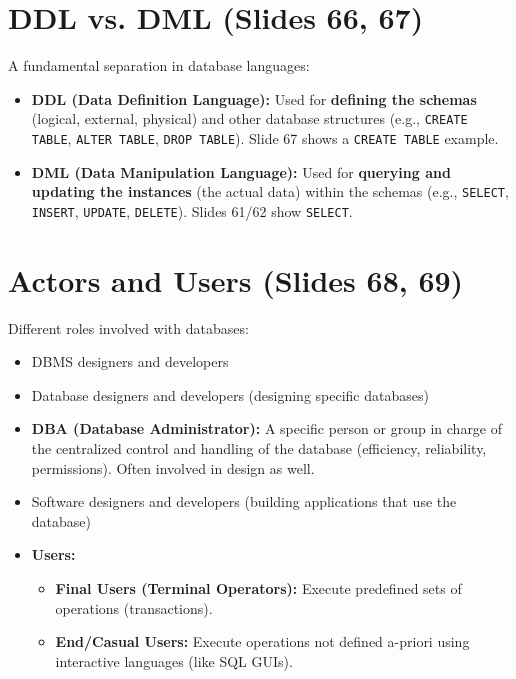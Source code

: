 \documentclass{article}
\begin{document}
	\section{DDL vs. DML (Slides 66, 67)}
	A fundamental separation in database languages:
	\begin{itemize}
		\item \textbf{DDL (Data Definition Language):} Used for \textbf{defining the schemas} (logical, external, physical) and other database structures (e.g., \texttt{CREATE TABLE}, \texttt{ALTER TABLE}, \texttt{DROP TABLE}). Slide 67 shows a \texttt{CREATE TABLE} example.
		\item \textbf{DML (Data Manipulation Language):} Used for \textbf{querying and updating the instances} (the actual data) within the schemas (e.g., \texttt{SELECT}, \texttt{INSERT}, \texttt{UPDATE}, \texttt{DELETE}). Slides 61/62 show \texttt{SELECT}.
	\end{itemize}
	
	\section{Actors and Users (Slides 68, 69)}
	Different roles involved with databases:
	\begin{itemize}
		\item DBMS designers and developers
		\item Database designers and developers (designing specific databases)
		\item \textbf{DBA (Database Administrator):} A specific person or group in charge of the centralized control and handling of the database (efficiency, reliability, permissions). Often involved in design as well.
		\item Software designers and developers (building applications that use the database)
		\item \textbf{Users:}
		\begin{itemize}
			\item \textbf{Final Users (Terminal Operators):} Execute predefined sets of operations (transactions).
			\item \textbf{End/Casual Users:} Execute operations not defined a-priori using interactive languages (like SQL GUIs).
		\end{itemize}
	\end{itemize}
	
\end{document}
